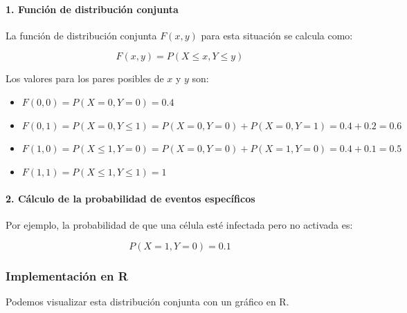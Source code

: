 \documentclass[
]{article}
\providecommand{\tightlist}{%
  \setlength{\itemsep}{0pt}\setlength{\parskip}{0pt}}
\begin{document}
\paragraph{1. Función de distribución conjunta}\label{funciuxf3n-de-distribuciuxf3n-conjunta}

La función de distribución conjunta \(F(x, y)\) para esta situación se calcula como:

\[
F(x, y) = P(X \leq x, Y \leq y)
\]

Los valores para los pares posibles de \(x\) y \(y\) son:

\begin{itemize}
\tightlist
\item
  \(F(0, 0) = P(X = 0, Y = 0) = 0.4\)
\item
  \(F(0, 1) = P(X = 0, Y \leq 1) = P(X = 0, Y = 0) + P(X = 0, Y = 1) = 0.4 + 0.2 = 0.6\)
\item
  \(F(1, 0) = P(X \leq 1, Y = 0) = P(X = 0, Y = 0) + P(X = 1, Y = 0) = 0.4 + 0.1 = 0.5\)
\item
  \(F(1, 1) = P(X \leq 1, Y \leq 1) = 1\)
\end{itemize}

\paragraph{2. Cálculo de la probabilidad de eventos específicos}\label{cuxe1lculo-de-la-probabilidad-de-eventos-especuxedficos}

Por ejemplo, la probabilidad de que una célula esté infectada pero no activada es:

\[
P(X = 1, Y = 0) = 0.1
\]

\subsubsection{Implementación en R}\label{implementaciuxf3n-en-r}

Podemos visualizar esta distribución conjunta con un gráfico en R.
\end{document}

